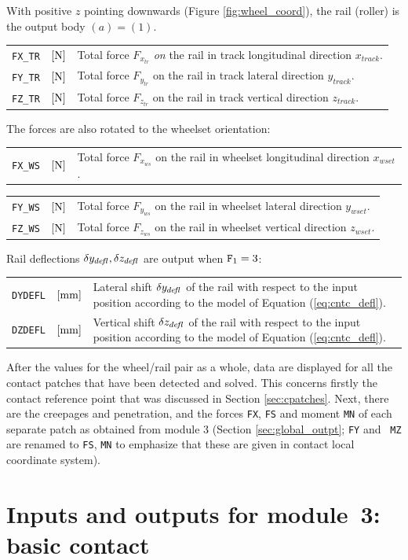 \documentclass[12pt]{report}
\renewcommand{\magenta}[1]{}
\newenvironment{inputvars}{\vspace{0.4\baselineskip}%

\begin{tabular}{>{\raggedright}p{22mm}p{19mm}p{113mm}}}{
\end{tabular}

}
\newcommand{\inpvar}[3]{{\small\tt #1} & $#2$ & #3 \\[1ex]}
\newcommand{\inpbreak}{\end{inputvars}\begin{inputvars}}
\begin{document}
With positive $z$ pointing downwards (Figure \ref{fig:wheel_coord}), the
rail (roller) is the output body $(a)=(1)$.
\begin{inputvars}
\inpvar{FX\_TR}{\bunit{N}}{Total force $F_{x_{tr}}$ {\em on\/} the rail in
        track longitudinal direction $x_{track}$.}
\inpvar{FY\_TR}{\bunit{N}}{Total force $F_{y_{tr}}$ on the rail in track
        lateral direction $y_{track}$.}
\inpvar{FZ\_TR}{\bunit{N}}{Total force $F_{z_{tr}}$ on the rail in track
        vertical direction $z_{track}$.}
\end{inputvars}
The forces are also rotated to the wheelset orientation:
\begin{inputvars}
\inpvar{FX\_WS}{\bunit{N}}{Total force $F_{x_{ws}}$ on the rail in wheelset
        longitudinal direction $x_{wset}$. \magenta{Input when ${\tt
        F}_1=1$.}}
\inpbreak
\inpvar{FY\_WS}{\bunit{N}}{Total force $F_{y_{ws}}$ on the rail in wheelset
        lateral direction $y_{wset}$.}
\inpvar{FZ\_WS}{\bunit{N}}{Total force $F_{z_{ws}}$ on the rail in wheelset
        vertical direction $z_{wset}$.}
\end{inputvars}
Rail deflections $\delta y_{de\!f\mkern-2mul}, \delta z_{de\!f\mkern-2mul}$ are output when ${\tt
F}_1=3$:
\begin{inputvars}
\inpvar{DYDEFL}{\bunit{mm}}{Lateral shift $\delta y_{de\!f\mkern-2mul}$ of the rail
        with respect to the input position according to the model of
        Equation (\ref{eq:cntc_defl}).}
\inpvar{DZDEFL}{\bunit{mm}}{Vertical shift $\delta z_{de\!f\mkern-2mul}$ of the rail
        with respect to the input position according to the model of
        Equation (\ref{eq:cntc_defl}).}
\end{inputvars}
After the values for the wheel/rail pair as a whole, data are displayed for
all the contact patches that have been detected and solved. This concerns
firstly the contact reference point that was discussed in Section
\ref{sec:cpatches}. Next, there are the creepages and penetration, and the
forces {\tt FX}, {\tt FS} and moment {\tt MN} of each separate patch as
obtained from module 3 (Section \ref{sec:global_outpt}; {\tt FY} and {\tt
MZ} are renamed to {\tt FS}, {\tt MN} to emphasize that these are
given in contact local coordinate system).

\color{black}


\chapter{Inputs and outputs for module~3: basic contact}
\label{chp:module3}
\end{document}
